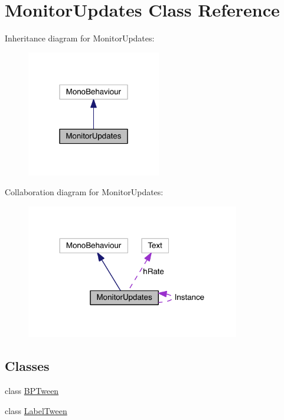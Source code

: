 \hypertarget{class_monitor_updates}{}\section{Monitor\+Updates Class Reference}
\label{class_monitor_updates}


Inheritance diagram for Monitor\+Updates\+:\nopagebreak
\begin{figure}[H]
\begin{center}
\leavevmode
\includegraphics[width=166pt]{class_monitor_updates__inherit__graph}
\end{center}
\end{figure}


Collaboration diagram for Monitor\+Updates\+:\nopagebreak
\begin{figure}[H]
\begin{center}
\leavevmode
\includegraphics[width=264pt]{class_monitor_updates__coll__graph}
\end{center}
\end{figure}
\subsection*{Classes}
\begin{DoxyCompactItemize}
\item 
class \hyperlink{class_monitor_updates_1_1_b_p_tween}{B\+P\+Tween}
\item 
class \hyperlink{class_monitor_updates_1_1_label_tween}{Label\+Tween}
\end{DoxyCompactItemize}
